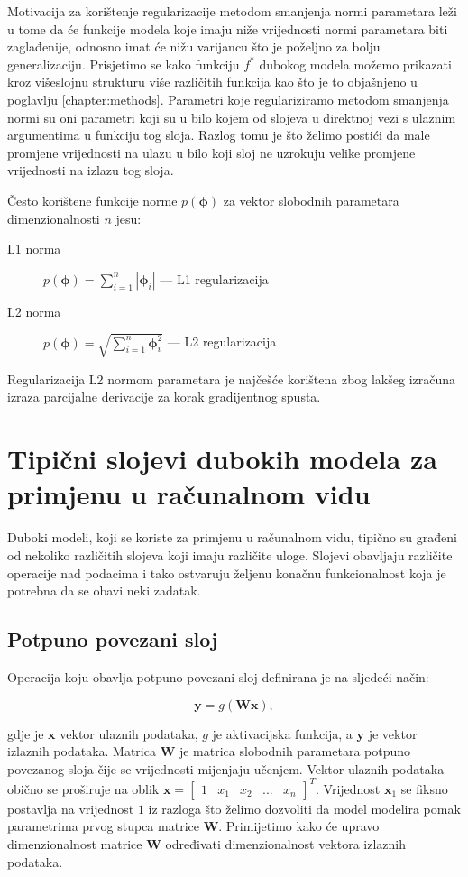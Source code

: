 \documentclass[times, utf8, diplomski, numeric]{fer}
\begin{document}
Motivacija za korištenje regularizacije metodom smanjenja normi parametara leži u tome da će funkcije modela koje imaju niže vrijednosti normi parametara biti zaglađenije, odnosno imat će nižu varijancu što je poželjno za bolju generalizaciju.
Prisjetimo se kako funkciju $f^*$ dubokog modela možemo prikazati kroz višeslojnu strukturu više različitih funkcija kao što je to objašnjeno u poglavlju \ref{chapter:methods}.
Parametri koje regulariziramo metodom smanjenja normi su oni parametri koji su u bilo kojem od slojeva u direktnoj vezi s ulaznim argumentima u funkciju tog sloja.
Razlog tomu je što želimo postići da male promjene vrijednosti na ulazu u bilo koji sloj ne uzrokuju velike promjene vrijednosti na izlazu tog sloja.

Često korištene funkcije norme $p(\boldsymbol{\phi})$ za vektor slobodnih parametara dimenzionalnosti $n$ jesu:
\begin{description}
 \item [L1 norma] $p(\boldsymbol{\phi})=\sum_{i=1}^n \left| \boldsymbol{\phi}_i \right|$ --- L1  regularizacija
 \item [L2 norma] $p(\boldsymbol{\phi})=\sqrt{\sum_{i=1}^n  \boldsymbol{\phi}_i^2 }$ --- L2  regularizacija
\end{description}
Regularizacija L2 normom parametara je najčešće korištena zbog lakšeg izračuna izraza parcijalne derivacije za korak gradijentnog spusta.

\section{Tipični slojevi dubokih modela za primjenu u računalnom vidu}
Duboki modeli, koji se koriste za primjenu u računalnom vidu, tipično su građeni od nekoliko različitih slojeva koji imaju različite uloge.
Slojevi obavljaju različite operacije nad podacima i tako ostvaruju željenu konačnu funkcionalnost koja je potrebna da se obavi neki zadatak.

\subsection{Potpuno povezani sloj}
Operacija koju obavlja potpuno povezani sloj definirana je na sljedeći način:

\begin{equation}
 \mathbf{y}=g(\mathbf{W}\mathbf{x}),
\end{equation}

\noindent gdje je $\mathbf{x}$ vektor ulaznih podataka, $g$ je aktivacijska funkcija, a  $\mathbf{y}$ je vektor izlaznih podataka. 
Matrica $\mathbf{W}$ je matrica slobodnih parametara potpuno povezanog sloja čije se vrijednosti mijenjaju učenjem.
Vektor ulaznih podataka obično se proširuje na oblik $\mathbf{x} = \begin{bmatrix} 1 & x_1 & x_2 & ... & x_n \end{bmatrix}^T$.
Vrijednost $\mathbf{x}_1$ se fiksno postavlja na vrijednost $1$ iz razloga što želimo dozvoliti da model modelira pomak parametrima prvog stupca matrice $\mathbf{W}$.
Primijetimo kako će upravo dimenzionalnost matrice $\mathbf{W}$ određivati dimenzionalnost vektora izlaznih podataka.
\end{document}
